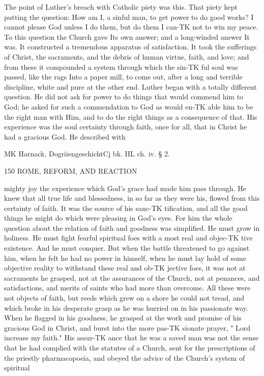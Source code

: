 \documentclass[12pt,a5paper,twoside]{book}
\begin{document}
{The point of Luther's breach with Catholic piety 
was this. That piety kept putting the question: How 
am I, a sinful man, to get power to do good works? I 
cannot please God unless I do them, but do them I can-TK
not to win my peace. To this question the Church 
gave Its own answer; and a long-winded answer It was. 
It constructed a tremendous apparatus of satisfaction. 
It took the sufferings of Christ, the sacraments, and 
the debris of human virtue, faith, and love; and from 
these it compounded a system through which the sin-TK
ful soul was passed, like the rags Into a paper mill, to 
come out, after a long and terrible discipline, white 
and pure at the other end. Luther began with a 
totally different question. He did not ask for power 
to do things that would commend him to God; he 
asked for such a commendation to God as would en-TK
able him to be the right man with Him, and to do the 
right things as a consequence of that. His experience 
was the soul certainty through faith, once for all, that 
in Christ he had a gracious God. He described with 

MK Harnack, DogriiengeschichtCj bk. IIL ch. iv. § 2. 



150 ROME, REFORM, AND REACTION 

mighty joy the experience which God's grace had 
made him pass through. He knew that all true life 
and blessedness, in so far as they were his, flowed from 
this certainty of faith. It was the source of his sanc-TK
tification, and all the good things he might do which 
were pleasing in God's eyes. For him the whole 
question about the relation of faith and goodness was 
simplified. He must grow in holiness. He must 
fight fearful spiritual foes with a most real and objec-TK
tive existence. And he must conquer. But when 
the battle threatened to go against him, when he felt 
he had no power in himself, when he must lay hold of 
some objective reality to withstand these real and ob-TK
jective foes, it was not at sacraments he grasped, not 
at the assurances of the Church, not at penances, and 
satisfactions, and merits of saints who had more than 
overcome. All these were not objects of faith, but 
reeds which grew on a shore he could not tread, and 
which broke in his desperate grasp as he was hurried 
on in his passionate way. When he flagged in his 
goodness, he grasped at the work and promise of his 
gracious God in Christ, and burst into the more pas-TK
sionate prayer, " Lord increase my faith." His assur-TK
ance that he was a saved man was not the sense that 
he had complied with the statutes of a Church, sent 
for the prescriptions of the priestly pharmacopoeia, and 
obeyed the advice of the Church's system of spiritual 



}
\end{document}
